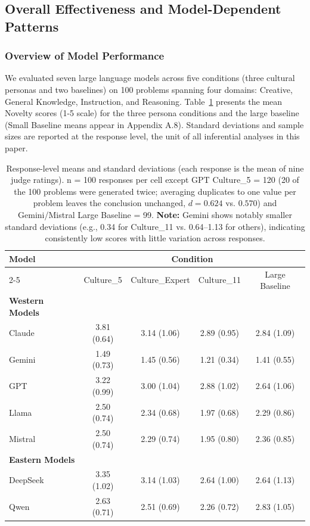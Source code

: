 \documentclass{article}
\begin{document}
\subsection{Overall Effectiveness and Model-Dependent Patterns}

\subsubsection{Overview of Model Performance}

We evaluated seven large language models across five conditions (three cultural personas and two baselines) on 100 problems spanning four domains: Creative, General Knowledge, Instruction, and Reasoning. Table~\ref{tab:means_novelty} presents the mean Novelty scores (1-5 scale) for the three persona conditions and the large baseline (Small Baseline means appear in Appendix A.8). Standard deviations and sample sizes are reported at the response level, the unit of all inferential analyses in this paper.

\begin{table}[H]
\centering
\caption{Mean Novelty Scores (1-5) by Model and Condition}
\label{tab:means_novelty}
\begin{tabular}{lcccc}
\toprule
\multirow{2}{*}{Model} & \multicolumn{4}{c}{Condition} \\
\cmidrule(lr){2-5}
 & Culture\_5 & Culture\_Expert & Culture\_11 & Large Baseline \\
\midrule
\textbf{Western Models} \\
Claude & 3.81 (0.64) & 3.14 (1.06) & 2.89 (0.95) & 2.84 (1.09) \\
Gemini & 1.49 (0.73) & 1.45 (0.56) & 1.21 (0.34) & 1.41 (0.55) \\
GPT & 3.22 (0.99) & 3.00 (1.04) & 2.88 (1.02) & 2.64 (1.06) \\
Llama & 2.50 (0.74) & 2.34 (0.68) & 1.97 (0.68) & 2.29 (0.86) \\
Mistral & 2.50 (0.74) & 2.29 (0.74) & 1.95 (0.80) & 2.36 (0.85) \\
\midrule
\textbf{Eastern Models} \\
DeepSeek & 3.35 (1.02) & 3.14 (1.03) & 2.64 (1.00) & 2.64 (1.13) \\
Qwen & 2.63 (0.71) & 2.51 (0.69) & 2.26 (0.72) & 2.83 (1.05) \\
\bottomrule
\end{tabular}
\caption*{\footnotesize Response-level means and standard deviations (each response is the mean of nine judge ratings). n = 100 responses per cell except GPT Culture\_5 = 120 (20 of the 100 problems were generated twice; averaging duplicates to one value per problem leaves the conclusion unchanged, $d = 0.624$ vs. $0.570$) and Gemini/Mistral Large Baseline = 99. \textbf{Note:} Gemini shows notably smaller standard deviations (e.g., 0.34 for Culture\_11 vs. 0.64--1.13 for others), indicating consistently low scores with little variation across responses.}
\end{table}
\end{document}
